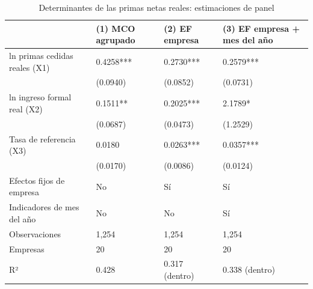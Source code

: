 \begin{table}[htbp]
\caption{Determinantes de las primas netas reales: estimaciones de panel}
\label{tab:tabla_4_regresion}
\begin{tabular}{llll}
\toprule
 & (1) MCO agrupado & (2) EF empresa & (3) EF empresa + mes del año \\
\midrule
ln primas cedidas reales (X1) & 0.4258*** & 0.2730*** & 0.2579*** \\
 & (0.0940) & (0.0852) & (0.0731) \\
ln ingreso formal real (X2) & 0.1511** & 0.2025*** & 2.1789* \\
 & (0.0687) & (0.0473) & (1.2529) \\
Tasa de referencia (X3) & 0.0180 & 0.0263*** & 0.0357*** \\
 & (0.0170) & (0.0086) & (0.0124) \\
Efectos fijos de empresa & No & Sí & Sí \\
Indicadores de mes del año & No & No & Sí \\
Observaciones & 1,254 & 1,254 & 1,254 \\
Empresas & 20 & 20 & 20 \\
R² & 0.428 & 0.317 (dentro) & 0.338 (dentro) \\
\bottomrule
\end{tabular}
\par{}
\end{table}

